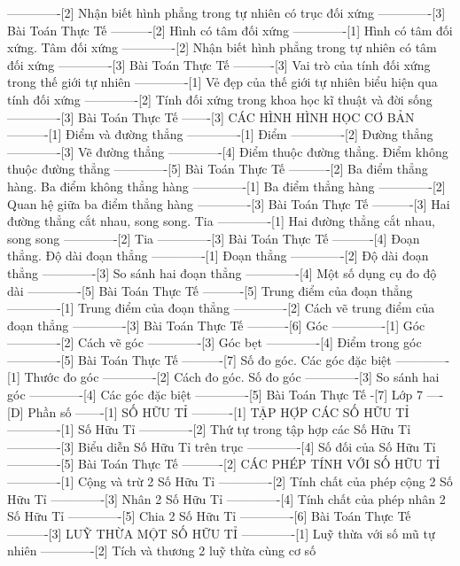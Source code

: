 -------------[2] Nhận biết hình phẳng trong tự nhiên có trục đối xứng
-------------[3] Bài Toán Thực Tế
----------[2] Hình có tâm đối xứng
-------------[1] Hình có tâm đối xứng. Tâm đối xứng
-------------[2] Nhận biết hình phẳng trong tự nhiên có tâm đối xứng
-------------[3] Bài Toán Thực Tế
----------[3] Vai trò của tính đối xứng trong thế giới tự nhiên
-------------[1] Vẻ đẹp của thế giới tự nhiên biểu hiện qua tính đối xứng
-------------[2] Tính đối xứng trong khoa học kĩ thuật và đời sống
-------------[3] Bài Toán Thực Tế
-------[3] CÁC HÌNH HÌNH HỌC CƠ BẢN
----------[1] Điểm và đường thẳng
-------------[1] Điểm
-------------[2] Đường thẳng
-------------[3] Vẽ đường thẳng
-------------[4] Điểm thuộc đường thẳng. Điểm không thuộc đường thẳng
-------------[5] Bài Toán Thực Tế
----------[2] Ba điểm thẳng hàng. Ba điểm không thẳng hàng
-------------[1] Ba điểm thẳng hàng
-------------[2] Quan hệ giữa ba điểm thẳng hàng
-------------[3] Bài Toán Thực Tế
----------[3] Hai đường thẳng cắt nhau, song song. Tia
-------------[1] Hai đường thẳng cắt nhau, song song
-------------[2] Tia
-------------[3] Bài Toán Thực Tế
----------[4] Đoạn thẳng. Độ dài đoạn thẳng
-------------[1] Đoạn thẳng
-------------[2] Độ dài đoạn thẳng
-------------[3] So sánh hai đoạn thẳng
-------------[4] Một số dụng cụ đo độ dài
-------------[5] Bài Toán Thực Tế
----------[5] Trung điểm của đoạn thẳng
-------------[1] Trung điểm của đoạn thẳng
-------------[2] Cách vẽ trung điểm của đoạn thẳng
-------------[3] Bài Toán Thực Tế
----------[6] Góc
-------------[1] Góc
-------------[2] Cách vẽ góc
-------------[3] Góc bẹt
-------------[4] Điểm trong góc
-------------[5] Bài Toán Thực Tế
----------[7] Số đo góc. Các góc đặc biệt
-------------[1] Thước đo góc
-------------[2] Cách đo góc. Số đo góc
-------------[3] So sánh hai góc
-------------[4] Các góc đặc biệt
-------------[5] Bài Toán Thực Tế
-[7] Lớp 7
----[D] Phần số
-------[1] SỐ HỮU TỈ
----------[1] TẬP HỢP CÁC SỐ HỮU TỈ
-------------[1] Số Hữu Tỉ
-------------[2] Thứ tự trong tập hợp các Số Hữu Tỉ
-------------[3] Biểu diễn Số Hữu Tỉ trên trục
-------------[4] Số đối của Số Hữu Tỉ
-------------[5] Bài Toán Thực Tế
----------[2] CÁC PHÉP TÍNH VỚI SỐ HỮU TỈ
-------------[1] Cộng và trừ 2 Số Hữu Tỉ
-------------[2] Tính chất của phép cộng 2 Số Hữu Tỉ
-------------[3] Nhân 2 Số Hữu Tỉ
-------------[4] Tính chất của phép nhân 2 Số Hữu Tỉ
-------------[5] Chia 2 Số Hữu Tỉ
-------------[6] Bài Toán Thực Tế
----------[3] LUỸ THỪA MỘT SỐ HỮU TỈ
-------------[1] Luỹ thừa với số mũ tự nhiên
-------------[2] Tích và thương 2 luỹ thừa cùng cơ số
